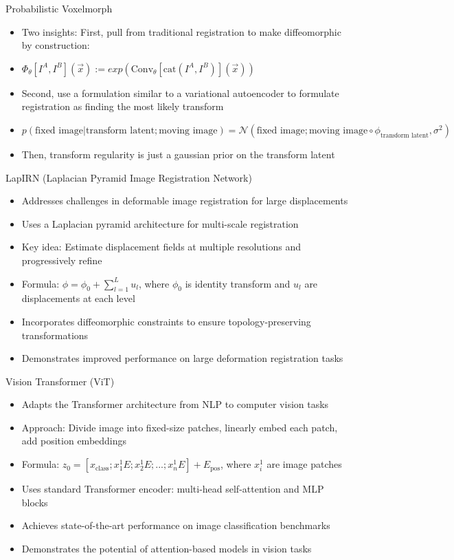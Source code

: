 \documentclass{beamer}
\begin{document}
\begin{frame}{Probabilistic Voxelmorph}
        \begin{itemize}
              \item Two insights: First, pull from traditional registration to make diffeomorphic by construction:
	      \item $ \Phi_\theta[I^A, I^B](\vec{x}) := exp(\text{Conv}_\theta[\text{cat}(I^A, I^B)](\vec{x}))$
              \item Second, use a formulation similar to a variational autoencoder to formulate registration as finding the most likely transform

	      \item $  p(\text{fixed image} | \text{transform latent}; \text{moving image} ) = \mathcal{N}(\text{fixed image}; \text{moving image} \circ \phi_{\text{transform latent}}, \sigma^2)$

	      \item Then, transform regularity is just a gaussian prior on the transform latent

        \end{itemize}
\end{frame}
\begin{frame}{LapIRN (Laplacian Pyramid Image Registration Network)}
\begin{itemize}
\item Addresses challenges in deformable image registration for large displacements
\item Uses a Laplacian pyramid architecture for multi-scale registration
\item Key idea: Estimate displacement fields at multiple resolutions and progressively refine
\item Formula: $\phi = \phi_0 + \sum_{l=1}^L u_l$, where $\phi_0$ is identity transform and $u_l$ are displacements at each level
\item Incorporates diffeomorphic constraints to ensure topology-preserving transformations
\item Demonstrates improved performance on large deformation registration tasks
\end{itemize}
\end{frame}
\begin{frame}{Vision Transformer (ViT)}
\begin{itemize}
\item Adapts the Transformer architecture from NLP to computer vision tasks
\item Approach: Divide image into fixed-size patches, linearly embed each patch, add position embeddings
\item Formula: $z_0 = [x_\text{class}; x_1^1 E; x_2^1 E; ...; x_n^1 E] + E_\text{pos}$, where $x_i^1$ are image patches
\item Uses standard Transformer encoder: multi-head self-attention and MLP blocks
\item Achieves state-of-the-art performance on image classification benchmarks
\item Demonstrates the potential of attention-based models in vision tasks
\end{itemize}
\end{frame}
\end{document}
